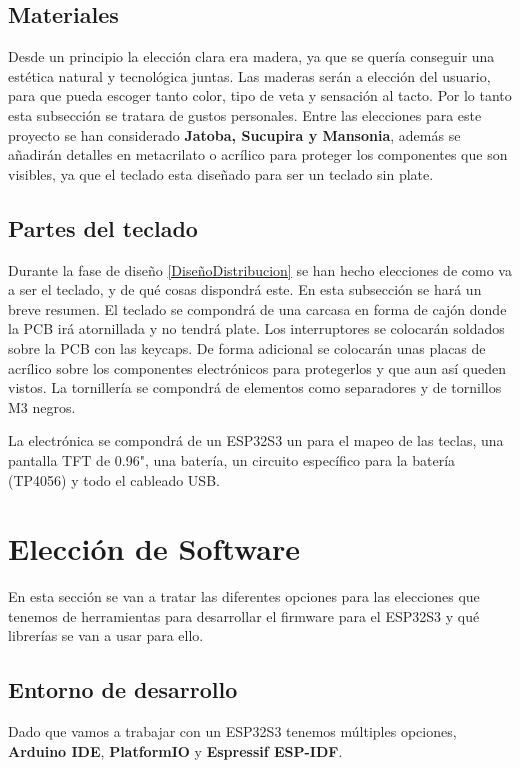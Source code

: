 \subsection{Materiales}
Desde un principio la elección clara era madera, ya que se quería conseguir una estética natural y tecnológica juntas. Las maderas serán a elección del usuario, para que pueda escoger tanto color, tipo de veta y sensación al tacto.
Por lo tanto esta subsección se tratara de gustos personales. Entre las elecciones para este proyecto se han considerado \textbf{Jatoba, Sucupira y Mansonia}, además se añadirán detalles en metacrilato o acrílico para proteger los componentes que son visibles, ya que el teclado esta diseñado para ser un teclado sin plate.

\subsection{Partes del teclado}
Durante la fase de diseño \ref{DiseñoDistribucion} se han hecho elecciones de como va a ser el teclado, y de qué cosas dispondrá este. En esta subsección se hará un breve resumen. El teclado se compondrá de una carcasa en forma de cajón donde la \gls{PCB} irá atornillada y no tendrá plate. Los interruptores se colocarán soldados sobre la \gls{PCB} con las keycaps. De forma adicional se colocarán unas placas de acrílico sobre los componentes electrónicos para protegerlos y que aun así queden vistos. La tornillería se compondrá de elementos como separadores y de tornillos M3 negros.

La electrónica se compondrá de un ESP32S3 un  para el mapeo de las teclas, una pantalla \gls{TFT} de 0.96", una batería, un circuito específico para la batería (TP4056) y todo el cableado USB.
\newpage

\section{Elección de Software}
En esta sección se van a tratar las diferentes opciones para las elecciones que tenemos de herramientas para desarrollar el firmware para el ESP32S3 y qué librerías se van a usar para ello.

\subsection{Entorno de desarrollo}
Dado que vamos a trabajar con un ESP32S3 tenemos múltiples opciones, \textbf{Arduino IDE}, \textbf{PlatformIO} y \textbf{Espressif ESP-IDF}.

